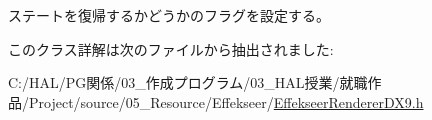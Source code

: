 ステートを復帰するかどうかのフラグを設定する。 



このクラス詳解は次のファイルから抽出されました\+:\begin{DoxyCompactItemize}
\item 
C\+:/\+H\+A\+L/\+P\+G関係/03\+\_\+作成プログラム/03\+\_\+\+H\+A\+L授業/就職作品/\+Project/source/05\+\_\+\+Resource/\+Effekseer/\mbox{\hyperlink{_effekseer_renderer_d_x9_8h}{Effekseer\+Renderer\+D\+X9.\+h}}\end{DoxyCompactItemize}
